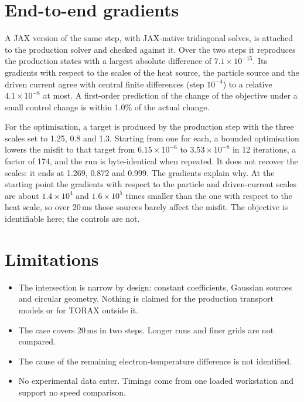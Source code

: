 \documentclass[11pt]{article}
\begin{document}
\section{End-to-end gradients}

A JAX version of the same step, with JAX-native tridiagonal solves, is
attached to the production solver and checked against it.  Over the two steps
it reproduces the production states with a largest absolute difference of
$7.1 \times 10^{-15}$.  Its gradients
with respect to the scales of the heat source, the particle source and the
driven current agree with central finite differences (step $10^{-4}$) to a
relative $4.1 \times 10^{-8}$ at most.  A first-order prediction of the change
of the objective under a small control change is within 1.0\% of the actual
change.

For the optimisation, a target is produced by the production step with the
three scales set to 1.25, 0.8 and 1.3.  Starting from one for each, a bounded
optimisation lowers the misfit to that target from $6.15 \times 10^{-6}$ to
$3.53 \times 10^{-8}$ in 12 iterations, a factor of 174, and the run is
byte-identical when repeated.  It does not recover the scales: it ends at
1.269, 0.872 and 0.999.  The gradients explain why.  At the starting point the
gradients with respect to the particle and driven-current scales are about
$1.4 \times 10^{4}$ and $1.6 \times 10^{5}$ times smaller than the one with
respect to the heat scale, so over 20\,ms those sources barely affect the
misfit.  The objective is identifiable here; the controls are not.

\section{Limitations}

\begin{itemize}
\item The intersection is narrow by design: constant coefficients, Gaussian
sources and circular geometry.  Nothing is claimed for the production
transport models or for TORAX outside it.
\item The case covers 20\,ms in two steps.  Longer runs and finer grids are not
compared.
\item The cause of the remaining electron-temperature difference is not
identified.
\item No experimental data enter.  Timings come from one loaded workstation
and support no speed comparison.
\end{itemize}
\end{document}
